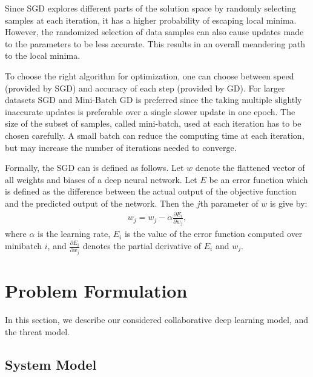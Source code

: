 \documentclass[conference]{IEEEtran}
\begin{document}
Since SGD explores different parts of the solution space by randomly selecting samples at each iteration, it has a higher probability of escaping local minima. However, the randomized selection of data samples can also cause updates made to the parameters to be less accurate. This results in an overall meandering path to the local minima. 

To choose the right algorithm for optimization, one can choose between speed (provided by SGD) and accuracy of each step (provided by GD). For larger datasets SGD and Mini-Batch GD is preferred since the taking multiple slightly inaccurate updates is preferable over a single slower update in one epoch.
The size of the subset of samples, called mini-batch, used at each iteration has to be chosen carefully. A small batch can reduce the
computing time at each iteration, but may increase the number of iterations needed to converge. 


Formally, the SGD can is defined as follows. 
Let $w$ denote the flattened
vector of all weights and biases of a deep neural
network. Let $E$ be an error function which is defined as the difference between the actual output of the objective function and the
predicted output of the network. 
Then the $j$th parameter of $w$ is give by:
\begin{align}\label{eq:SGD}
w_j = w_j -\alpha \frac{\partial E_i}{\partial w_j}, 
\end{align}
where $\alpha$ is the learning rate,  $E_i$ is the value of the error function computed over minibatch $i$, and  
$\frac{\partial E_i}{\partial w_j}$ denotes the partial derivative of $E_i$ and $w_j$. 
 

\section{Problem Formulation}
In this section, we describe our considered collaborative deep learning model, and the threat model. 

\subsection{System Model} \label{sec:systemModel}
\end{document}
